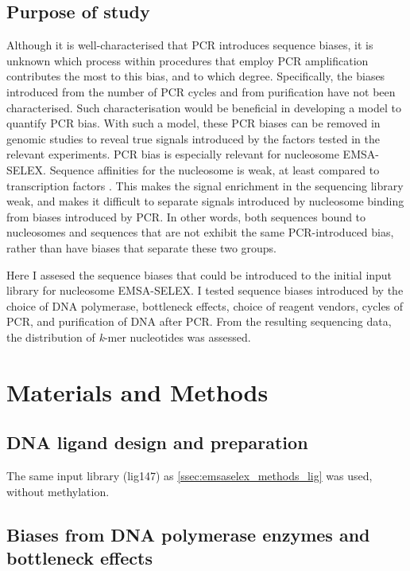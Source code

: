 \documentclass[parskip=full, numbers=noenddot]{scrreprt}
\begin{document}
\subsection{Purpose of study}
\label{ssec:pcrbias_intro_why}

Although it is well-characterised that PCR introduces sequence biases, it is unknown which process within procedures that employ PCR amplification contributes the most to this bias, and to which degree.  Specifically, the biases introduced from the number of PCR cycles and from purification have not been characterised.  Such characterisation would be beneficial in developing a model to quantify PCR bias.  With such a model, these PCR biases can be removed in genomic studies to reveal true signals introduced by the factors tested in the relevant experiments.  PCR bias is especially relevant for nucleosome EMSA-SELEX.  Sequence affinities for the nucleosome is weak, at least compared to transcription factors \citep{struhl_determinants_2013}.  This makes the signal enrichment in the sequencing library weak, and makes it difficult to separate signals introduced by nucleosome binding from biases introduced by PCR.  In other words, both sequences bound to nucleosomes and sequences that are not exhibit the same PCR-introduced bias, rather than have biases that separate these two groups.

Here I assesed the sequence biases that could be introduced to the initial input library for nucleosome EMSA-SELEX.  I tested sequence biases introduced by the choice of DNA polymerase, bottleneck effects, choice of reagent vendors, cycles of PCR, and purification of DNA after PCR.  From the resulting sequencing data, the distribution of \emph{k}-mer nucleotides was assessed.

\section{Materials and Methods}
\label{sec:pcrbias_methods}

\subsection{DNA ligand design and preparation}
\label{ssec:pcrbias_methods_lig}

The same input library (lig147) as \ref{ssec:emsaselex_methods_lig} was used, without methylation.

\subsection{Biases from DNA polymerase enzymes and bottleneck effects}
\label{ssec:pcrbias_methods_enz}
\end{document}

